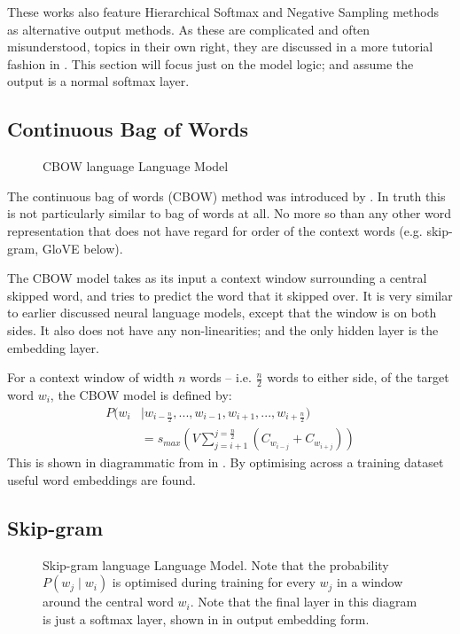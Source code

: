 \documentclass[parskip]{komatufte}
\begin{document}

These works also feature Hierarchical Softmax and Negative Sampling methods as alternative output methods.
As these are complicated and often misunderstood, topics in their own right, they are discussed in a more tutorial fashion in .
This section will focus just on the model logic; and assume the output is a normal softmax layer.

\subsection{Continuous Bag of Words}\label{sec:cbow}
\begin{figure}
	\caption{CBOW language Language Model}
	\label{fig:cbow}
	\centering
	 
\end{figure}

The continuous bag of words (CBOW) method was introduced by .
In truth this is not particularly similar to bag of words at all.
No more so than any other word representation that does not have regard for order of the context words (e.g. skip-gram, GloVE below).

The CBOW model takes as its input a context window surrounding a central skipped word, and tries to predict the word that it skipped over.
It is very similar to earlier discussed neural language models, except that the window is on both sides.
It also does not have any non-linearities;
and the only hidden layer is the embedding layer.

For a context window of width $n$ words -- i.e. $\frac{n}{2}$ words to either side, of the target word $w_i$,
the CBOW model is defined by:
\begin{align}
P(w_i & \mid w_{i-\frac{n}{2}},..., w_{i-1}, w_{i+1},...,w_{i+\frac{n}{2}})  \nonumber
\\  & = s_{max}(V \sum_{j=i+1}^{j=\frac{n}{2}} \left( C_{w_{i-j}}+C_{w_{i+j}} \right))
\end{align}
This is shown in diagrammatic from in .
By optimising across a training dataset
useful word embeddings are found.


\subsection{Skip-gram}\label{sec:skip-gram}
\begin{figure}
	\caption{\label{fig:skip-gram} Skip-gram language Language Model. Note that the probability $P(w_j \mid w_i)$ is optimised during training for every $w_j$ in a window around the central word $w_i$.
	Note that the final layer in this diagram is just a softmax layer, shown in in output embedding form.
	}
	\centering
	 
\end{figure}
\end{document}
